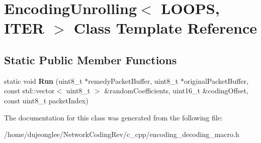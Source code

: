 \hypertarget{class_encoding_unrolling}{}\section{Encoding\+Unrolling$<$ L\+O\+O\+PS, I\+T\+ER $>$ Class Template Reference}
\label{class_encoding_unrolling}
\subsection*{Static Public Member Functions}
\begin{DoxyCompactItemize}
\item 
static void {\bfseries Run} (uint8\+\_\+t $\ast$remedy\+Packet\+Buffer, uint8\+\_\+t $\ast$original\+Packet\+Buffer, const std\+::vector$<$ uint8\+\_\+t $>$ \&random\+Coefficients, uint16\+\_\+t \&coding\+Offset, const uint8\+\_\+t packet\+Index)\hypertarget{class_encoding_unrolling_a7c36b3fced839de91e82a14ae480bec4}{}\label{class_encoding_unrolling_a7c36b3fced839de91e82a14ae480bec4}

\end{DoxyCompactItemize}


The documentation for this class was generated from the following file\+:\begin{DoxyCompactItemize}
\item 
/home/dujeonglee/\+Network\+Coding\+Rev/c\+\_\+cpp/encoding\+\_\+decoding\+\_\+macro.\+h\end{DoxyCompactItemize}

